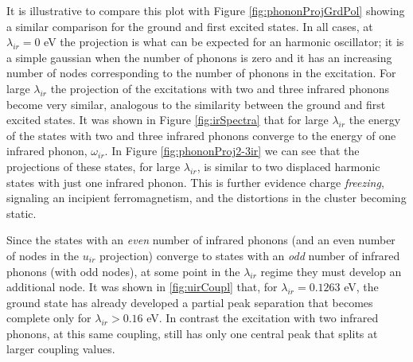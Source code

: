 It is illustrative to compare this plot with Figure \ref{fig:phononProjGrdPol} showing a similar comparison for the ground and first excited states.
In all cases, at $\lambda_{ir}=0$ eV the projection is what can be expected for an harmonic oscillator; it is a simple gaussian when the number of phonons is zero and it has an increasing number of nodes corresponding to the number of phonons in the excitation.
For large $\lambda_{ir}$ the projection of the excitations with two and three infrared phonons become very similar, analogous to the similarity between the ground and first excited states.
It was shown in Figure \ref{fig:irSpectra} that for large $\lambda_{ir}$ the energy of the states with two and three infrared phonons converge to the energy of one infrared phonon, $\omega_{ir}$.
In Figure \ref{fig:phononProj2-3ir} we can see that the projections of these states, for large $\lambda_{ir}$, is similar to two displaced harmonic states with just one infrared phonon.
This is further evidence charge \textit{freezing}, signaling an incipient ferromagnetism, and the distortions in the cluster becoming static.

Since the states with an \textit{even} number of infrared phonons (and an even number of nodes in the $u_{ir}$ projection) converge to states with an \textit{odd} number of infrared phonons (with odd nodes), at some point in the $\lambda_{ir}$ regime they must develop an additional node.
It was shown in \ref{fig:uirCoupl} that, for $\lambda_{ir}=0.1263$ eV, the ground state has already developed a partial peak separation that becomes complete only for $\lambda_{ir}>0.16$ eV.
In contrast the excitation with two infrared phonons, at this same coupling, still has only one central peak that splits at larger coupling values.
